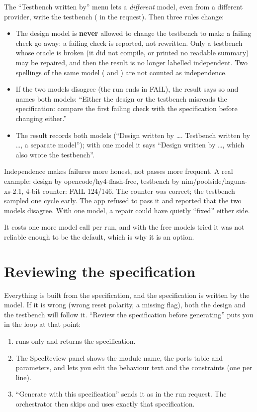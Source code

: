 The ``Testbench written by'' menu lets a \emph{different} model, even from a different provider, write the testbench ( in the request). Then three rules change:
\begin{itemize}
  \item The design model is \textbf{never} allowed to change the testbench to make a failing check go away: a failing check is reported, not rewritten. Only a testbench whose oracle is broken (it did not compile, or printed no readable summary) may be repaired, and then the result is no longer labelled independent. Two spellings of the same model ( and ) are not counted as independence.
  \item If the two models disagree (the run ends in FAIL), the result says so and names both models: ``Either the design or the testbench misreads the specification: compare the first failing check with the specification before changing either.''
  \item The result records both models (``Design written by \ldots. Testbench written by \ldots, a separate model''); with one model it says ``Design written by \ldots, which also wrote the testbench''.
\end{itemize}

\begin{keyidea}
Independence makes failures more honest, not passes more frequent. A real example: design by opencode/hy4-flash-free, testbench by nim/poolside/laguna-xs-2.1, 4-bit counter: FAIL 124/146. The counter was correct; the testbench sampled one cycle early. The app refused to pass it and reported that the two models disagree. With one model, a repair could have quietly ``fixed'' either side.
\end{keyidea}

It costs one more model call per run, and with the free models tried it was not reliable enough to be the default, which is why it is an option.

\section{Reviewing the specification}
\label{sec:specreview}

Everything is built from the specification, and the specification is written by the model. If it is wrong (wrong reset polarity, a missing flag), both the design and the testbench will follow it. ``Review the specification before generating'' puts you in the loop at that point:
\begin{enumerate}
  \item {} runs only  and returns the specification.
  \item The SpecReview panel shows the module name, the ports table and parameters, and lets you edit the behaviour text and the constraints (one per line).
  \item ``Generate with this specification'' sends it as  in the run request. The orchestrator then skips  and uses exactly that specification.
\end{enumerate}

